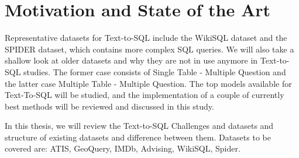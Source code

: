 

\section{Motivation and State of the Art}

Representative datasets for Text-to-SQL include the WikiSQL\cite{zhong_seq2sql_2017} dataset and
the SPIDER\cite{yu_spider_2019} dataset, which contains more complex SQL queries.
We will also take a shallow look at older datasets and why they are not in use anymore in Text-to-SQL studies.
The former case consists of Single Table - Multiple Question and the latter case Multiple Table - Multiple Question. The top models available for Text-To-SQL will be studied, and the implementation of a couple of currently best methods will be reviewed and discussed in this study.

In this thesis, we will review the Text-to-SQL Challenges and datasets and structure of existing datasets and difference between them. Datasets to be covered are: ATIS, GeoQuery, IMDb, Advising, WikiSQL, Spider.
